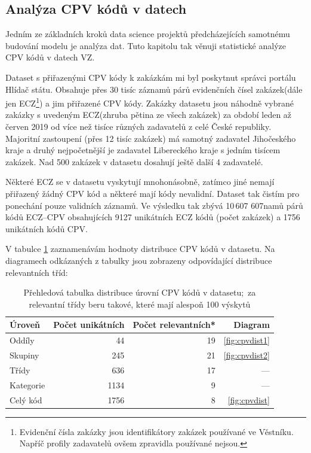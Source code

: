 \documentclass[thesis=M,czech]{FITthesis}[2019/12/23]
\begin{document}
\subsection{Analýza CPV kódů v datech}
\label{sec:cpv_distribution}

Jedním ze základních kroků data science projektů předcházejících samotnému budování modelu je analýza dat. Tuto kapitolu tak věnuji statistické analýze CPV kódů v datech VZ.

Dataset s přiřazenými CPV kódy k zakázkám mi byl poskytnut správci portálu Hlídač státu. Obsahuje přes 30 tisíc záznamů párů evidenčních čísel zakázek(dále jen ECZ\footnote{Evidenční čísla zakázky jsou identifikátory zakázek používané ve Věstníku. Napříč profily zadavatelů ovšem zpravidla používané nejsou.}) a jim přiřazené CPV kódy. Zakázky datasetu jsou náhodně vybrané zakázky s uvedeným ECZ(zhruba pětina ze všech zakázek) za období leden až červen 2019 od více než tisíce různých zadavatelů z celé České republiky. Majoritní zastoupení (přes 12 tisíc zakázek) má samotný zadavatel Jihočeského kraje a druhý nejpočetnější je zadavatel Libereckého kraje s jedním tisícem zakázek. Nad 500 zakázek v datasetu dosahují ještě další 4 zadavatelé.

Některé ECZ se v datasetu vyskytují mnohonásobně, zatímco jiné nemají přiřazený žádný CPV kód a některé mají kódy nevalidní. Dataset tak čistím pro ponechání pouze validních záznamů. Ve výsledku tak zbývá 10\,607 607namů párů kódů ECZ--CPV obsahujících 9127 unikátních ECZ kódů (počet zakázek) a 1756 unikátních kódů CPV.

V tabulce \ref{table:CPVdist} zaznamenávám hodnoty distribuce CPV kódů v datasetu. Na diagramech odkázaných z tabulky jsou zobrazeny odpovídající distribuce relevantních tříd:
\begin{table}[h!]
\centering
    \begin{tabular}{|l|r|r|r|}
         \hline
          Úroveň & Počet unikátních & Počet relevantních* & Diagram\\\hline
          \hline
          Oddíly & 44 & 19 & \ref{fig:cpvdist1} \\\hline
          Skupiny & 245 & 21 & \ref{fig:cpvdist2} \\\hline
          Třídy & 636 & 17 & --- \\\hline
          Kategorie & 1134 & 9 & --- \\\hline
          Celý kód & 1756 & 8 & \ref{fig:cpvdist} \\\hline
    \end{tabular}
\caption[Přehledová tabulka distribuce úrovní CPV kódů v datasetu]{Přehledová tabulka distribuce úrovní CPV kódů v datasetu;\newline*~za relevantní třídy beru takové, které mají alespoň 100 výskytů}
\label{table:CPVdist}
\end{table}
\end{document}
